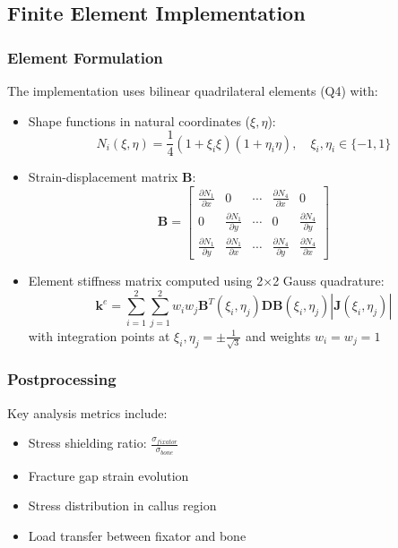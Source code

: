 \documentclass{article}
\begin{document}
\subsection{Finite Element Implementation}

\subsubsection{Element Formulation}

The implementation uses bilinear quadrilateral elements (Q4) with:
\begin{itemize}
  \item Shape functions in natural coordinates ($\xi,\eta$):
        \[
          N_i(\xi,\eta) = \frac{1}{4}(1+\xi_i\xi)(1+\eta_i\eta), \quad \xi_i,\eta_i \in \{-1,1\}
        \]
  \item Strain-displacement matrix $\mathbf{B}$:
        \[
          \mathbf{B} = \begin{bmatrix}
            \frac{\partial N_1}{\partial x} & 0                               & \cdots & \frac{\partial N_4}{\partial x} & 0                               \\
            0                               & \frac{\partial N_1}{\partial y} & \cdots & 0                               & \frac{\partial N_4}{\partial y} \\
            \frac{\partial N_1}{\partial y} & \frac{\partial N_1}{\partial x} & \cdots & \frac{\partial N_4}{\partial y} & \frac{\partial N_4}{\partial x}
          \end{bmatrix}
        \]
  \item Element stiffness matrix computed using 2×2 Gauss quadrature:
        \[
          \mathbf{k}^e = \sum_{i=1}^2\sum_{j=1}^2 w_iw_j\mathbf{B}^T(\xi_i,\eta_j)\mathbf{D}\mathbf{B}(\xi_i,\eta_j)|\mathbf{J}(\xi_i,\eta_j)|
        \]
        with integration points at $\xi_i,\eta_j = \pm\frac{1}{\sqrt{3}}$ and weights $w_i=w_j=1$
\end{itemize}

\subsubsection{Postprocessing}

Key analysis metrics include:
\begin{itemize}
  \item Stress shielding ratio: $\frac{\sigma_{fixator}}{\sigma_{bone}}$
  \item Fracture gap strain evolution
  \item Stress distribution in callus region
  \item Load transfer between fixator and bone
\end{itemize}
\end{document}
